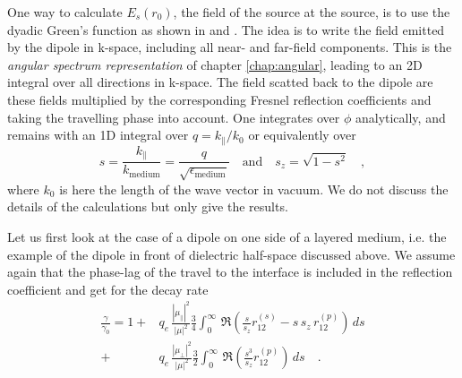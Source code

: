 One way to calculate $E_s(r_0)$, the field of the source at the source, is to use the dyadic Green's function as shown in \cite{Novotny-Hecht2012} and \cite{Hohenester2020}. The idea is to write the  field emitted by the dipole in k-space, including all near- and far-field components. This is the \emph{angular spectrum representation} of chapter \ref{chap:angular}, leading to an 2D integral over all directions in k-space. The field scatted back to the dipole are these fields multiplied by the corresponding Fresnel reflection coefficients and taking the travelling phase into account. 
One integrates over $\phi$ analytically, and 
remains with an 1D integral over $q = k_\parallel / k_0$ or equivalently  over
\begin{equation}
  s= \frac{k_\parallel}{k_\text{medium}} = \frac{q}{ \sqrt{\epsilon_\text{medium}}} \quad \text{and} \quad s_z = \sqrt{1 - s^2} \quad ,
 \end{equation}
where $k_0$ is here the length of the wave vector in vacuum. We do not discuss the details of the calculations but only give the results.

Let us first look at the case of a dipole on one side of a layered medium, i.e. the example of the dipole in front of  dielectric half-space discussed above. 
We assume again  that the phase-lag of the travel to the interface is included in the reflection coefficient and get for the decay rate
\begin{align}
\frac{\gamma}{\gamma_0} = 1 + &q_e \, \frac{| \mu_\parallel|^2}{|\mu|^2} \frac{3}{4}
\int_0^\infty \, \Re 
\left( \frac{s}{s_z} r_{12}^{(s)} - s \, s_z \, r_{12}^{(p)} 
\right) \, ds \label{eq:dipole_decay_single} \\
+ & q_e \,\frac{| \mu_\perp|^2}{|\mu|^2} \frac{3}{2}
\int_0^\infty \, \Re 
\left( \frac{s^3}{s_z} r_{12}^{(p)} 
\right) \, ds  \nonumber  \quad .
\end{align}


